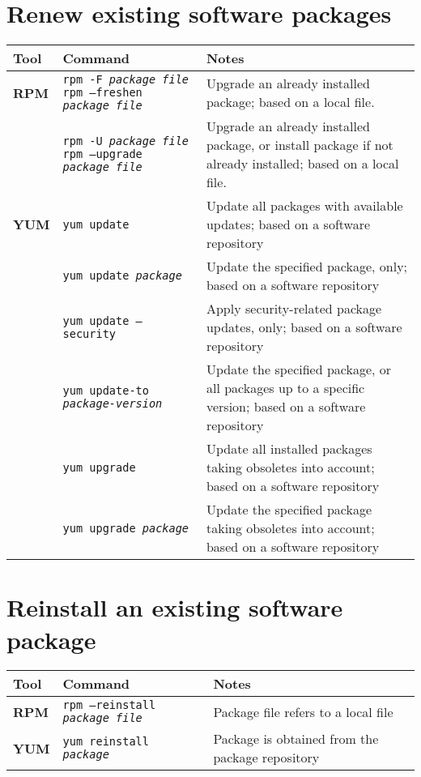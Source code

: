 \documentclass[10pt]{article}
\begin{document}
\section{Renew existing software packages}
\begin{tabular}{ p{3.5cm} p{9cm} p{11cm}}
  \hline
  \rowcolor{Gray}
  \textbf{Tool} & \textbf{Command} & \textbf{Notes} \\
  \hline 
  \textbf{RPM} & \texttt{rpm -F \textit{package file}} \newline \texttt{rpm --freshen \textit{package file}} & Upgrade an already installed package; based on a local file. \\
  \rowcolor{Gray}
  & \texttt{rpm -U \textit{package file}} \newline \texttt{rpm --upgrade \textit{package file}} & Upgrade an already installed package, or install package if not already installed; based on a local file. \\
  \textbf{YUM} & \texttt{yum update} & Update all packages with available updates; based on a software repository \\
  \rowcolor{Gray}
  & \texttt{yum update \textit{package}} & Update the specified package, only; based on a software repository \\  
  & \texttt{yum update --security} & Apply security-related package updates, only; based on a software repository \\  
  \rowcolor{Gray}
  & \texttt{yum update-to \textit{package-version}} & Update the specified package, or all packages up to a specific version; based on a software repository \\  
  & \texttt{yum upgrade} & Update all installed packages taking obsoletes into account; based on a software repository \\  
  \rowcolor{Gray}
  & \texttt{yum upgrade \textit{package}} & Update the specified package taking obsoletes into account; based on a software repository \\  
  \hline
\end{tabular}

\newpage

\cheatsheet

\section{Reinstall an existing software package}
\begin{tabular}{ p{3.5cm} p{9cm} p{11cm}}
  \hline
  \rowcolor{Gray}
  \textbf{Tool} & \textbf{Command} & \textbf{Notes} \\
  \hline 
  \textbf{RPM} & \texttt{rpm --reinstall \textit{package file}} & Package file refers to a local file \\
  \rowcolor{Gray}
  \textbf{YUM} & \texttt{yum reinstall \textit{package}} & Package is obtained from the package repository \\
  \hline
\end{tabular}
\end{document}
